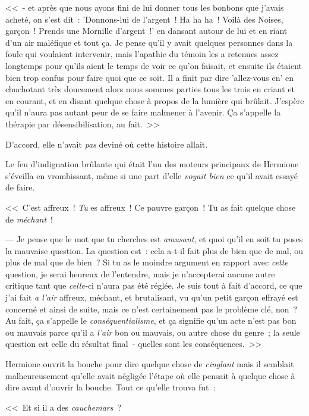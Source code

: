 <<~- et après que nous ayons fini de lui donner tous les bonbons que j'avais acheté, on s'est dit~: 'Donnons-lui de l'argent~! Ha ha ha~! Voilà des Noises, garçon~! Prends une Mornille d'argent~!' en dansant autour de lui et en riant d'un air maléfique et tout ça. Je pense qu'il y avait quelques personnes dans la foule qui voulaient intervenir, mais l'apathie du témoin les a retenues assez longtemps pour qu'ils aient le temps de voir ce qu'on faisait, et ensuite ils étaient bien trop confus pour faire quoi que ce soit. Il a finit par dire 'allez-vous en' en chuchotant très doucement alors nous sommes parties tous les trois en criant et en courant, et en disant quelque chose à propos de la lumière qui brûlait. J'espère qu'il n'aura pas autant peur de se faire malmener à l'avenir. Ça s'appelle la thérapie par désensibilisation, au fait.~>>

D'accord, elle n'avait \emph{pas} deviné où cette histoire allait.

Le feu d'indignation brûlante qui était l'un des moteurs principaux de Hermione s'éveilla en vrombissant, même si une part d'elle \emph{voyait bien} ce qu'il avait essayé de faire.

<<~C'est affreux~! \emph{Tu} es affreux~! Ce pauvre garçon~! Tu as fait quelque chose de \emph{méchant}~!

--- Je pense que le mot que tu cherches est \emph{amusant}, et quoi qu'il en soit tu poses la mauvaise question. La question est~: cela a-t-il fait plus de bien que de mal, ou plus de mal que de bien~? Si tu as le moindre argument en rapport avec \emph{cette} question, je serai heureux de l'entendre, mais je n'accepterai aucune autre critique tant que \emph{celle-}ci n'aura pas été réglée. Je suis tout à fait d'accord, ce que j'ai fait \emph{a l'air} affreux, méchant, et brutalisant, vu qu'un petit garçon effrayé est concerné et ainsi de suite, mais ce n'est certainement pas le problème clé, non~? Au fait, ça s'appelle le \emph{conséquentialisme}, et ça signifie qu'un acte n'est pas bon ou mauvais parce qu'il a \emph{l'air} bon ou mauvais, ou autre chose du genre~; la seule question est celle du résultat final~- quelles sont les conséquences.~>>

Hermione ouvrit la bouche pour dire quelque chose de \emph{cinglant} mais il semblait malheureusement qu'elle avait négligée l'étape où elle pensait à quelque chose à dire avant d'ouvrir la bouche. Tout ce qu'elle trouva fut~:

<<~Et si il a des \emph{cauchemars}~?

